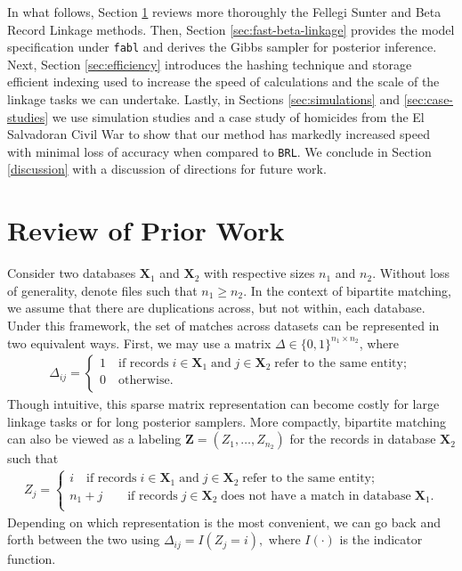 \documentclass[12pt,letterpaper]{article}
\newcommand{\1}[1]{\mathbb{I}\!\left[#1\right]} %
\begin{document}
	In what follows, Section \ref{sec:review-of_prior-work} reviews more thoroughly the Fellegi Sunter and Beta Record Linkage methods. Then, Section \ref{sec:fast-beta-linkage} provides the model specification under \texttt{fabl} and derives the Gibbs sampler for posterior inference. Next, Section \ref{sec:efficiency} introduces the hashing technique and storage efficient indexing used to increase the speed of calculations and the scale of the linkage tasks we can undertake. Lastly, in Sections \ref{sec:simulations} and \ref{sec:case-studies} we use simulation studies and a case study of homicides from the El Salvadoran Civil War to show that our method has markedly increased speed with minimal loss of accuracy when compared to \texttt{BRL}. We conclude in Section \ref{discussion} with a discussion of directions for future work. 
	

	
%	
	

\section{Review of Prior Work}
\label{sec:review-of_prior-work}

Consider two databases $\bm{X}_1$ and $\bm{X}_2$ with respective sizes $n_1$ and $n_2$. Without loss of generality, denote files such that $n_1 \geq n_2$. In the context of bipartite matching, we assume that there are duplications across, but not within, each database. Under this framework, the set of matches across datasets can be represented in two equivalent ways. First, we may use a matrix $\Delta \in \{0, 1\}^{n_1 \times n_2}$, where
\begin{align}
	\Delta_{ij} =
	\begin{cases}
		1 \quad \text{if records}\;  i \in \bm{X}_1 \; \text{and}\; j\in \bm{X}_2 \; \text{refer to the same entity}; \\
		0 \quad \text{otherwise}.\\
	\end{cases}
\end{align}
Though intuitive, this sparse matrix representation can become costly for large linkage tasks or for long posterior samplers. More compactly, bipartite matching can also be viewed as a labeling $\bm{Z} = (Z_1, \ldots, Z_{n_2})$ for the records in database $\bm{X}_2$ such that 
\begin{align}
	Z_{j} =
	\begin{cases}
		i \quad \text{if records}\;  i \in \bm{X}_1 \; \text{and}\; j\in \bm{X}_2 \; \text{refer to the same entity}; \\
		n_1 + j \quad  \quad \text{if records}\;  j \in \bm{X}_2 \; \text{does not have a match in database}\; \bm{X}_1. \\
	\end{cases}
\end{align}
Depending on which representation is the most convenient, we can go back and forth between the two using $\Delta_{ij} = I(Z_j = i),$ where $I(\cdot)$ is the indicator function. 
\end{document}
